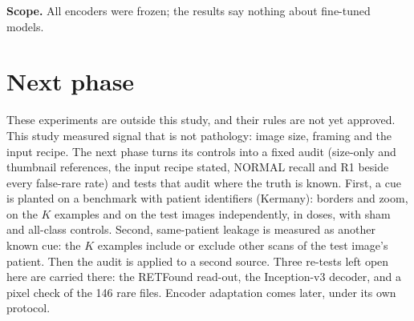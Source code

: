 \documentclass[conference]{IEEEtran}
\begin{document}
\textbf{Scope.} All encoders were frozen; the results say nothing about fine-tuned models.

\section{Next phase}
These experiments are outside this study, and their rules are not yet approved. This study measured signal that is not pathology: image size, framing and the input recipe. The next phase turns its controls into a fixed audit (size-only and thumbnail references, the input recipe stated, NORMAL recall and R1 beside every false-rare rate) and tests that audit where the truth is known. First, a cue is planted on a benchmark with patient identifiers (Kermany): borders and zoom, on the $K$ examples and on the test images independently, in doses, with sham and all-class controls. Second, same-patient leakage is measured as another known cue: the $K$ examples include or exclude other scans of the test image's patient. Then the audit is applied to a second source. Three re-tests left open here are carried there: the RETFound read-out, the Inception-v3 decoder, and a pixel check of the 146 rare files. Encoder adaptation comes later, under its own protocol.
\end{document}
